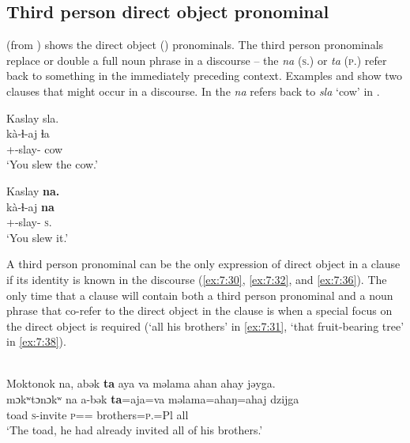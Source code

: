 \subsection{Third person direct object pronominal}\label{sec:7.3.2}
\hypertarget{RefHeading1212181525720847}{}
 (from \citealt{FriesenMamalis2008}) shows the direct object (\DO) pronominals. The third person \DO pronominals replace or double a full noun phrase in a discourse -- the \textit{na} (\textsc{s}.{\DO}) or \textit{ta} (\textsc{p}.{\DO}) refer back to something in the immediately preceding context. Examples  and  show two clauses that might occur in a discourse. In  the \textit{na} refers back to \textit{sla} ‘cow’ in .

\ea\label{ex:7:29}
Kaslay  sla.   \\   
\gll kà-ɬ{}-aj    ɬa  \\    
{\twoS}+{\PFV}-slay{}-{\CL}  cow  \\       
\glt ‘You slew the cow.’            
\z

\ea\label{ex:7:30}
Kaslay  \textbf{na}\textbf{.}\\
\gll kà-ɬ{}-aj     \textbf{na}\\
{\twoS}+{\PFV}-slay{}-{\CL}    \textsc{s}.{\DO}  \\
\glt ‘You slew it.’
\z

A third person \DO pronominal can be the only expression of direct object in a clause if its identity is known in the discourse (\ref{ex:7:30}, \ref{ex:7:32}, and \ref{ex:7:36}). The only time that a clause will contain both a third person \DO pronominal and a noun phrase that co-refer to the direct object in the clause is when a special focus on the direct object is required (‘all his brothers’ in \ref{ex:7:31}, ‘that fruit-bearing tree’ in \ref{ex:7:38}). 


\ea\label{ex:7:31}\\
Moktonok  na,  abək  \textbf{ta}  aya  va  məlama  ahan  ahay  jəyga.\\
\gll mɔkʷtɔnɔkʷ na  a-bək       \textbf{ta}=aja=va  məlama=ahaŋ=ahaj  dzijga\\
toad    {\PSP}  \textsc{s}-invite  \textsc{p}={\PLU}={\PRF}  brothers=\textsc{p}.{\POSS}=Pl  all\\
\glt ‘The toad, he had already invited all of his brothers.’  
\z

